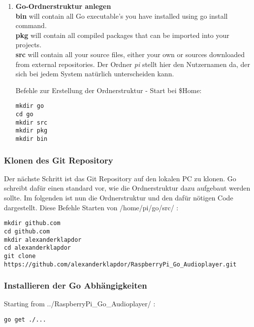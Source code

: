 \begin{enumerate}
\item \textbf{Go-Ordnerstruktur anlegen} \\
\textbf{bin} will contain all Go executable's you have installed using go install command. \\ 
\textbf{pkg} will contain all compiled packages that can be imported into your projects. 
\\
\textbf{src} will contain all your source files, either your own or sources downloaded from external repositories. \newline
Der Ordner \textit{pi} stellt hier den Nutzernamen da, der sich bei jedem System natürlich unterscheiden kann. \\
\begin{minipage}[t]{\textwidth}
Befehle zur Erstellung der Ordnerstruktur - Start bei \$Home:
\begin{lstlisting}[caption={Erstellung der Go Ordnerstruktur}]
mkdir go
cd go
mkdir src
mkdir pkg
mkdir bin
\end{lstlisting}
\end{minipage}


\end{enumerate}

\subsubsection{Klonen des Git Repository}
Der nächste Schritt ist das Git Repository auf den lokalen PC zu klonen. Go schreibt dafür einen standard vor, wie die Ordnerstruktur dazu aufgebaut werden sollte. Im folgenden ist nun die Ordnerstruktur und den dafür nötigen Code dargestellt. 
Diese Befehle Starten von /home/pi/go/src/ :
\begin{lstlisting}[caption={Klonen des Git Repository}]
mkdir github.com 
cd github.com
mkdir alexanderklapdor
cd alexanderklapdor
git clone https://github.com/alexanderklapdor/RaspberryPi_Go_Audioplayer.git
\end{lstlisting}

\subsubsection{Installieren der Go Abhängigkeiten}
Starting from ../RaspberryPi\_Go\_Audioplayer/ :
\begin{lstlisting}
go get ./...  
\end{lstlisting}

